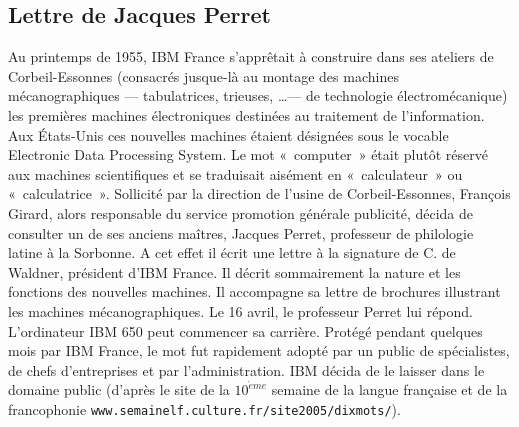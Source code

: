 \subsection{Lettre de Jacques Perret}\label{annexe:perret}
Au printemps de 1955, IBM France s'apprêtait à construire dans ses ateliers 
de Corbeil-Essonnes (consacrés jusque-là au montage des machines mécanographiques 
--- tabulatrices, trieuses, \ldots --- de technologie électromécanique) 
les premières machines électroniques destinées au traitement de l'information. 
Aux États-Unis ces nouvelles machines étaient désignées sous le vocable 
Electronic Data Processing System. Le mot «~computer~» était plutôt réservé 
aux machines scientifiques et se traduisait aisément en «~calculateur~» ou «~calculatrice~».
Sollicité par la direction de l'usine de Corbeil-Essonnes, François Girard, 
alors responsable du service promotion générale publicité, 
décida de consulter un de ses anciens maîtres, Jacques Perret, professeur de philologie 
latine à la Sorbonne. A cet effet il écrit une lettre à la signature de C. de Waldner, 
président d'IBM France. Il décrit sommairement la nature et les fonctions des 
nouvelles machines. Il accompagne sa lettre de brochures illustrant les machines 
mécanographiques. Le 16 avril, le professeur Perret lui répond.
L'ordinateur IBM 650 peut commencer sa carrière.
Protégé pendant quelques mois par IBM France, le mot fut rapidement adopté
par un public de spécialistes, de chefs d'entreprises et par l'administration. 
IBM décida de le laisser dans le domaine public
(d'après le site de la $10^{\grave eme}$ semaine de la langue française et de la francophonie
{\tt www.semainelf.culture.fr/site2005/dixmots/}).

